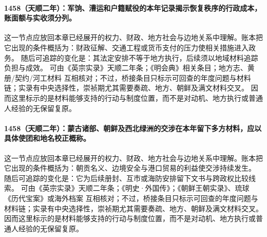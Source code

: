 \paragraph{1458（天顺二年）：军饷、漕运和户籍赋役的本年记录揭示恢复秩序的行政成本，账面额与实收须分列。} 这一节点应放回本章已经展开的权力、财政、地方社会与边地关系中理解。账本把它出现的条件概括为：财政征解、交通工程或货币支付的压力使相关措施进入政务。 随后可追踪的变化是：其法定安排不等于地方执行，后续须以地域材料追踪负担与成效。 可由《英宗实录》天顺二年条；《明会典》相关条目；地方志、黄册/契约/河工材料 互相核对；不过，桥接条目只标示可回查的年度问题与材料链；实录有中央选择性，崇祯期尤其需要奏疏、地方、朝鲜及满文材料交叉。 因而这里标示的是材料能够支持的行动与制度位置，而不是对动机、地方执行或普通人经验的无保留复原。

\paragraph{1458（天顺二年）：蒙古诸部、朝鲜及西北绿洲的交涉在本年留下多方材料，应以具体使团和地名校正概称。} 这一节点应放回本章已经展开的权力、财政、地方社会与边地关系中理解。账本把它出现的条件概括为：朝贡名义、边境安全与港口贸易的利益使交涉持续发生。 随后可追踪的变化是：它为后续册封、互市或海防安排留下文书与跨政权比较线索。 可由《英宗实录》天顺二年条；《明史·外国传》；《朝鲜王朝实录》、琉球《历代宝案》或海外档案 互相核对；不过，桥接条目只标示可回查的年度问题与材料链；实录有中央选择性，崇祯期尤其需要奏疏、地方、朝鲜及满文材料交叉。 因而这里标示的是材料能够支持的行动与制度位置，而不是对动机、地方执行或普通人经验的无保留复原。
